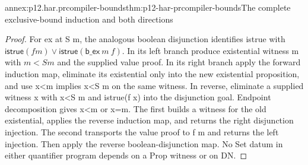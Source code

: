\begin{annexitem}{annex:p12.har.prcompiler-bounds}{thm:p12-har-prcompiler-bounds}{The complete exclusive-bound induction and both directions}
\begin{proof}
For ex at S m, the analogous boolean disjunction identifies istrue
with \(\mathsf{istrue}(f m)\vee
\mathsf{istrue}(\mathsf{b\_ex}\ m\ f)\).
In its left branch produce existential witness m with \(m<S m\)
and the supplied value proof. In its right branch apply the forward
induction map, eliminate its existential only into the new existential
proposition, and use x<m implies x<S m on the same witness.
In reverse, eliminate a supplied witness x with x<S m and istrue(f x)
into the disjunction goal. Endpoint decomposition gives x<m or x=m.
The first builds a witness for the old existential, applies the
reverse induction map, and returns the right disjunction injection.
The second transports the value proof to f m and returns the left
injection. Then apply the reverse boolean-disjunction map. No Set
datum in either quantifier program depends on a Prop witness or on DN.
\end{proof}
\end{annexitem}

